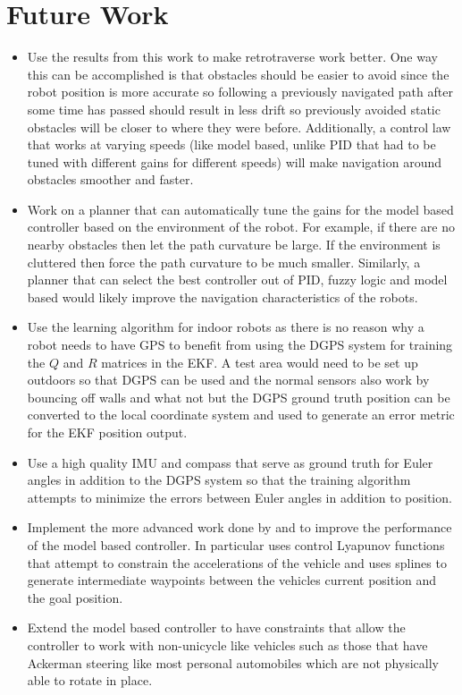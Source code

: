 \chapter{Future Work}
\label{ch:futurework}

\begin{itemize}
\item Use the results from this work to make retrotraverse work better. One way this can be accomplished is that obstacles should be easier to avoid since the robot position is more accurate so following a previously navigated path after some time has passed should result in less drift so previously avoided static obstacles will be closer to where they were before. Additionally, a control law that works at varying speeds (like model based, unlike PID that had to be tuned with different gains for different speeds) will make navigation around obstacles smoother and faster.
\item Work on a planner that can automatically tune the gains for the model based controller based on the environment of the robot. For example, if there are no nearby obstacles then let the path curvature be large. If the environment is cluttered then force the path curvature to be much smaller. Similarly, a planner that can select the best controller out of PID, fuzzy logic and model based would likely improve the navigation characteristics of the robots.
\item Use the learning algorithm for indoor robots as there is no reason why a robot needs to have GPS to benefit from using the DGPS system for training the $Q$ and $R$ matrices in the EKF. A test area would need to be set up outdoors so that DGPS can be used and the normal sensors also work by bouncing off walls and what not but the DGPS ground truth position can be converted to the local coordinate system and used to generate an error metric for the EKF position output.
\item Use a high quality IMU and compass that serve as ground truth for Euler angles in addition to the DGPS system so that the training algorithm attempts to minimize the errors between Euler angles in addition to position.
\item Implement the more advanced work done by \cite{Lapierre06} and \cite{Gulati08} to improve the performance of the model based controller. In particular \cite{Gulati08} uses control Lyapunov functions that attempt to constrain the accelerations of the vehicle and uses splines to generate intermediate waypoints between the vehicles current position and the goal position.
\item Extend the model based controller to have constraints that allow the controller to work with non-unicycle like vehicles such as those that have Ackerman steering like most personal automobiles which are not physically able to rotate in place.
\end{itemize}
